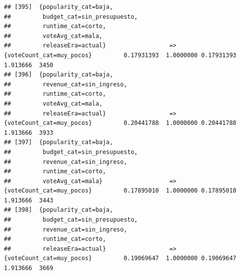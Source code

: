 \documentclass[
]{article}
\begin{document}
\begin{verbatim}
## [395]  {popularity_cat=baja,                                                                                                    
##         budget_cat=sin_presupuesto,                                                                                             
##         runtime_cat=corto,                                                                                                      
##         voteAvg_cat=mala,                                                                                                       
##         releaseEra=actual}                  => {voteCount_cat=muy_pocos}         0.17931393  1.0000000 0.17931393 1.913666  3450
## [396]  {popularity_cat=baja,                                                                                                    
##         revenue_cat=sin_ingreso,                                                                                                
##         runtime_cat=corto,                                                                                                      
##         voteAvg_cat=mala,                                                                                                       
##         releaseEra=actual}                  => {voteCount_cat=muy_pocos}         0.20441788  1.0000000 0.20441788 1.913666  3933
## [397]  {popularity_cat=baja,                                                                                                    
##         budget_cat=sin_presupuesto,                                                                                             
##         revenue_cat=sin_ingreso,                                                                                                
##         runtime_cat=corto,                                                                                                      
##         voteAvg_cat=mala}                   => {voteCount_cat=muy_pocos}         0.17895010  1.0000000 0.17895010 1.913666  3443
## [398]  {popularity_cat=baja,                                                                                                    
##         budget_cat=sin_presupuesto,                                                                                             
##         revenue_cat=sin_ingreso,                                                                                                
##         runtime_cat=corto,                                                                                                      
##         releaseEra=actual}                  => {voteCount_cat=muy_pocos}         0.19069647  1.0000000 0.19069647 1.913666  3669

\end{verbatim}
\end{document}
